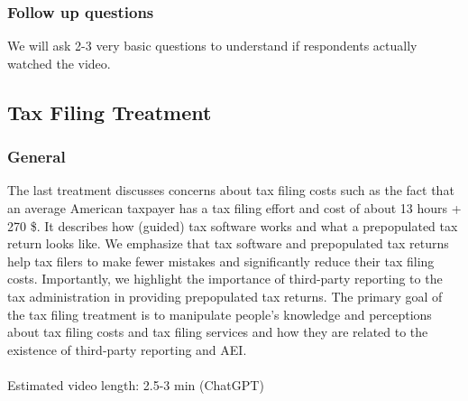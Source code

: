 \documentclass[11pt]{article}
\begin{document}
\subsubsection*{Follow up questions}
We will ask 2-3 very basic questions to understand if respondents actually watched the video.
\subsection{Tax Filing Treatment}
\subsubsection*{General}
The last treatment discusses concerns about tax filing costs such as the fact that an average American taxpayer has a tax filing effort and cost of about 13 hours + 270 \$. It describes how (guided) tax software works and what a prepopulated tax return looks like. We emphasize that tax software and prepopulated tax returns help tax filers to make fewer mistakes and significantly reduce their tax filing costs. Importantly, we highlight the importance of third-party reporting to the tax administration in providing prepopulated tax returns. The primary goal of the tax filing treatment is to manipulate people’s knowledge and perceptions about tax filing costs and tax filing services and how they are related to the existence of third-party reporting and AEI. \\ \\  
Estimated video length: 2.5-3 min (ChatGPT)
\end{document}
